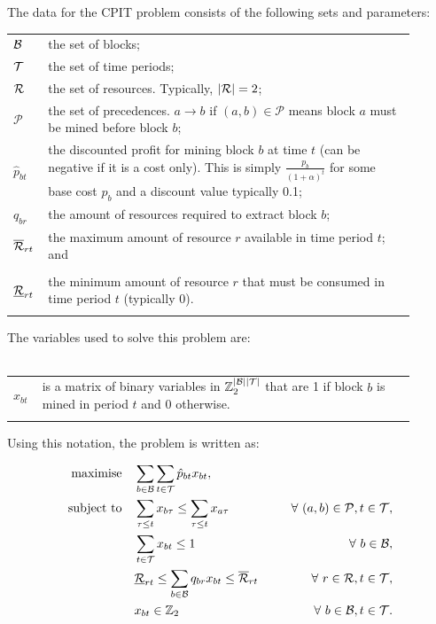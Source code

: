 \documentclass[preprint]{elsarticle}
\begin{document}
The data for the CPIT problem consists of the following sets and parameters:

\begin{tabular}{p{0.05\linewidth}p{0.85\linewidth}}
$\S{B}$ & the set of blocks;\\
$\S{T}$ & the set of time periods;\\
$\S{R}$ & the set of resources. Typically, $|\S{R}| = 2$;\\
$\mathcal{P}$ & the set of precedences. $a \to b$ if $(a,b) \in \mathcal{P}$
                means block $a$ must be mined before block $b$;\\
$\hat{p}_{bt}$  & the discounted profit for mining block $b$ at time $t$
            (can be negative if it is a cost only). This
            is simply $\frac{p_b}{(1+\alpha)^t}$ for some base cost
            $p_b$ and a discount value typically 0.1;\\
$q_{br}$ & the amount of resources required to extract block $b$;\\
$\overline{\S{R}}_{rt}$ & the maximum amount of resource $r$ available in time period $t$; and\\\hfill\\
$\underline{\S{R}}_{rt}$ & the minimum amount of resource $r$ that must be consumed in time period $t$ (typically 0).\\\hfill\\
\end{tabular}
\par
The variables used to solve this problem are:\\\hfill\\
\begin{tabular}{p{0.05\linewidth}p{0.85\linewidth}}
$x_{bt}$ & is a matrix of binary variables in $\Bin^{|\S{B}||\S{T}|}$ that are 1 if block $b$ is mined in
                      period $t$ and 0 otherwise.\\\hfill\\
\end{tabular}

Using this notation, the problem is written as:

{\footnotesize
\begin{align}
\Max \quad & \displaystyle\sum_{b \in \S{B}}\displaystyle\sum_{t \in \S{T}} \hat{p}_{bt}x_{bt},\label{eq:cpit_form}\\
\ST \quad & \displaystyle\sum_{\tau \leq t}x_{b\tau} \leq \displaystyle\sum_{\tau \leq t}x_{a\tau} \qquad \qquad & \forall\ (a,b) \in \mathcal{P}, t \in \S{T},\nonumber\\
& \displaystyle\sum_{t \in \S{T}}x_{bt} \leq 1 & \forall\ b \in \S{B},\nonumber\\
& \underline{\S{R}}_{rt} \leq \displaystyle\sum_{b \in \S{B}}q_{br}x_{bt} \leq \overline{\S{R}}_{rt} & \forall\ r \in \S{R}, t \in \S{T},\nonumber\\
& x_{bt} \in \Bin & \forall\ b \in \S{B}, t \in \S{T}\nonumber.
\end{align}
}
\end{document}
